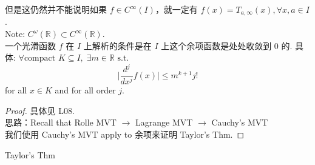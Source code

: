 \documentclass[lang=cn,11pt]{elegantbook}
\begin{document}
\begin{remark}
   但是这仍然并不能说明如果 $f \in C^{\infty}(I)$，就一定有 $f(x) = T_{a, \infty}(x), \forall x,a \in I$. \\
   Note:  $C^\omega (\mathbb{R}) \subset C^\infty(\mathbb{R}).$\\
    一个光滑函数 $f$ 在 $I$ 上解析的条件是在 $I$ 上这个余项函数是处处收敛到 0 的.
    具体: $
    \forall \text{compact } K \subseteq I, \; \exists m \in \mathbb{R} \text { s.t. } $
    $$
    \bigg |\frac{d^j}{dx^j} f(x) \bigg | \leq m^{k+1} j! 
    $$
    for all $x \in K$ and for all order $j$.
\end{remark}

\begin{proof}
    具体见 L08.\\
    思路：Recall that Rolle MVT $\rightarrow$ Lagrange MVT $\rightarrow$ Cauchy's MVT\\
    我们使用 Cauchy's MVT apply to 余项来证明 Taylor's Thm.
\end{proof}


\begin{theorem}{Taylor's Thm}\label{Taylor's Thm}
    
\end{theorem}
\end{document}
